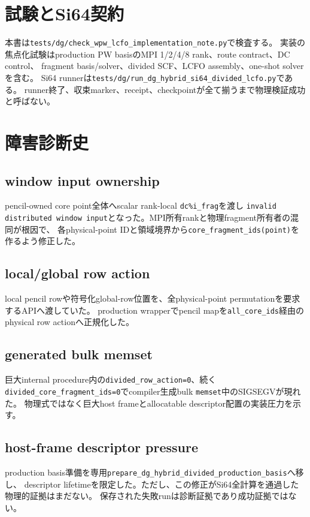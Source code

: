 \documentclass[11pt,a4paper]{article}
\newcommand{\code}[1]{\texttt{#1}}
\begin{document}
\section{試験とSi64契約}
本書は\code{tests/dg/check\_wpw\_lcfo\_implementation\_note.py}で検査する。
実装の焦点化試験はproduction PW basisのMPI 1/2/4/8 rank、route contract、DC control、
fragment basis/solver、divided SCF、LCFO assembly、one-shot solverを含む。
Si64 runnerは\code{tests/dg/run\_dg\_hybrid\_si64\_divided\_lcfo.py}である。
runner終了、収束marker、receipt、checkpointが全て揃うまで物理検証成功と呼ばない。

\appendix
\section{障害診断史}
\subsection{window input ownership}
pencil-owned core point全体へscalar rank-local \code{dc\%i\_frag}を渡し
\code{invalid distributed window input}となった。MPI所有rankと物理fragment所有者の混同が根因で、
各physical-point IDと領域境界から\code{core\_fragment\_ids(point)}を作るよう修正した。

\subsection{local/global row action}
local pencil rowや符号化global-row位置を、全physical-point permutationを要求するAPIへ渡していた。
production wrapperでpencil mapを\code{all\_core\_ids}経由のphysical row actionへ正規化した。

\subsection{generated bulk memset}
巨大internal procedure内の\code{divided\_row\_action=0}、続く
\code{divided\_core\_fragment\_ids=0}でcompiler生成bulk \code{memset}中のSIGSEGVが現れた。
物理式ではなく巨大host frameとallocatable descriptor配置の実装圧力を示す。

\subsection{host-frame descriptor pressure}
production basis準備を専用\code{prepare\_dg\_hybrid\_divided\_production\_basis}へ移し、
descriptor lifetimeを限定した。ただし、この修正がSi64全計算を通過した物理的証拠はまだない。
保存された失敗runは診断証拠であり成功証拠ではない。
\end{document}
